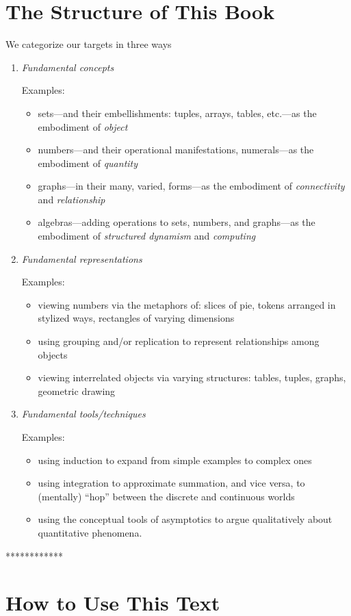 \section{The Structure of  This Book}
\label{sec:thisbook}

We categorize our targets in three ways
\begin{enumerate}
\item
{\it Fundamental concepts}

{\small\sf Examples:}
\begin{itemize}
\item
sets---and their embellishments: tuples, arrays, tables, etc.---as the
embodiment of {\it object}
\item
numbers---and their operational manifestations, numerals---as the
embodiment of {\it quantity}
\item
graphs---in their many, varied, forms---as the embodiment of {\it
  connectivity} and {\it relationship}
\item
algebras---adding operations to sets, numbers, and graphs---as the
embodiment of {\it structured dynamism} and {\it computing}
\end{itemize}

\item
{\it Fundamental representations}

{\small\sf Examples:}
\begin{itemize}
\item
viewing numbers via the metaphors of: slices of pie, tokens arranged in
stylized ways, rectangles of varying dimensions
\item
using grouping and/or replication to represent relationships among
objects
\item
viewing interrelated objects via varying structures: tables, tuples,
graphs, geometric drawing
\end{itemize}

\item
{\it Fundamental tools/techniques}

{\small\sf Examples:}
\begin{itemize}
\item
using induction to expand from simple examples to complex ones
\item
using integration to approximate summation, and vice versa, to
(mentally) ``hop'' between the discrete and continuous worlds
\item
using the conceptual tools of asymptotics to argue qualitatively about
quantitative phenomena.
\end{itemize}
\end{enumerate}

************

\section{How to Use This Text}
\label{sec:how-to-use}




